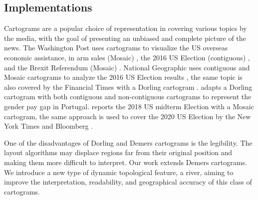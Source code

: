 \subsection{Implementations}

Cartograms are a popular choice of representation in covering various topics by the media, with the goal of presenting an unbiased and complete picture of the news. The Washington Post uses cartograms to visualize the US overseas economic assistance, in arm sales (Mosaic) \cite{bearak2016Everything}, the 2016 US Election (contiguous) \cite{gamio2016Election}, and the Brexit Referendum (Mosaic) \cite{taylor2016What}. National Geographic uses contiguous and Mosaic cartograms to analyze the 2016 US Election results \cite{miller2016Election}, the same topic is also covered by the Financial Times with a Dorling cartogram \cite{stabe2016Search}.  adapts a Dorling cartogram with both contiguous and non-contiguous cartograms to represent the gender pay gap in Portugal.  reports the 2018 US midterm Election with a Mosaic cartogram, the same approach is used to cover the 2020 US Election by the New York Times \cite{thelearningnetwork2020What} and Bloomberg \cite{mccartney20202020}.




One of the disadvantages of Dorling and Demers cartograms is the legibility. The layout algorithms may displace regions far from their original position and making them more difficult to interpret. Our work extends Demers cartograms. We introduce a new type of dynamic topological feature, a river, aiming to improve the interpretation, readability, and geographical accuracy of this class of cartograms.